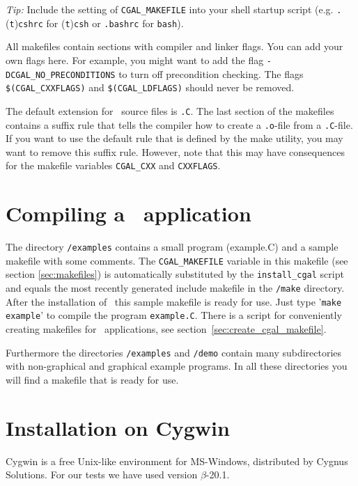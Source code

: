 \textit{Tip:} Include the setting of \texttt{CGAL\_MAKEFILE} into your
shell startup script (e.g. \texttt{.}(\texttt{t})\texttt{cshrc} for
(\texttt{t})\texttt{csh} or \texttt{.bashrc} for \texttt{bash}).

All makefiles contain sections with compiler and linker flags.  You
can add your own flags here. For example, you might want to add the
flag \texttt{-DCGAL\_NO\_PRECONDITIONS} to turn off precondition
checking. The flags \texttt{\$(CGAL\_CXXFLAGS)} and
\texttt{\$(CGAL\_LDFLAGS)} should never be removed.

The default extension for \cgal\ source files is \texttt{.C}.  The
last section of the makefiles contains a suffix rule that tells the
compiler how to create a \texttt{.o}-file from a \texttt{.C}-file.  If
you want to use the default rule that is defined by the make utility,
you may want to remove this suffix rule.  However, note that this may
have consequences for the makefile variables \texttt{CGAL\_CXX} and
\texttt{CXXFLAGS}.

\section{Compiling a \cgal\ application}
The directory \texttt{\cgaldir/examples} contains a small program
(example.C) and a sample makefile with some comments. The
\texttt{CGAL\_MAKEFILE} variable in this makefile (see section
\ref{sec:makefiles}) is automatically substituted by the
\texttt{install\_cgal} script and equals the most recently generated
include makefile in the \texttt{\cgaldir/make} directory. After the
installation of \cgal\ this sample makefile is ready for use. Just
type '\texttt{make example}' to compile the program
\texttt{example.C}. There is a script for conveniently creating
makefiles for \cgal\ applications, see
section~\ref{sec:create_cgal_makefile}.

Furthermore the directories \texttt{\cgaldir/examples} and
\texttt{\cgaldir/demo} contain many subdirectories with non-graphical
and graphical example programs.  In all these directories you will
find a makefile that is ready for use.

\section{Installation on Cygwin}\label{sec:cygwin}

Cygwin is a free Unix-like environment for MS-Windows, distributed by
Cygnus Solutions. For our tests we have used version $\beta$-20.1.

